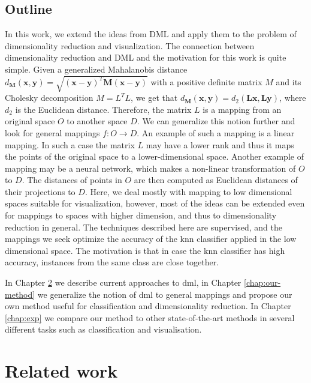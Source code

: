 \documentclass[12pt,a4paper]{report}
\begin{document}
\section{Outline}
In this work, we extend the ideas from DML and apply them to the problem of dimensionality reduction and visualization. The connection between dimensionality reduction and DML and the motivation for this work is quite simple. Given a generalized Mahalanobis distance $d_{\bm{M}}(\textbf{x},\textbf{y}) = \sqrt{(\textbf{x}-\textbf{y})^{T}\bm{M}(\textbf{x}-\textbf{y})}$ with a positive definite matrix $M$ and its Cholesky decomposition $M=L^TL$, we get that $d_{\bm{M}}(\textbf{x},\textbf{y}) = d_{2}(\bm{L}\textbf{x},\bm{L}\textbf{y})$, where $d_2$ is the Euclidean distance. Therefore, the matrix $L$ is a mapping from an original space $O$ to another space $D$. We can generalize this notion further and look for general mappings $f: O \to D$. An example of such a mapping is a linear mapping. In such a case the matrix $L$ may have a lower rank and thus it maps the points of the original space to a lower-dimensional space. Another example of mapping may be a neural network, which makes a non-linear transformation of $O$ to $D$. The distances of points in $O$ are then computed as Euclidean distances of their projections to $D$. Here, we deal mostly with mapping to low dimensional spaces suitable for visualization, however, most of the ideas can be extended even for mappings to spaces with higher dimension, and thus to dimensionality reduction in general. The techniques described here are supervised, and the mappings we seek optimize the accuracy of the \ac{knn} classifier applied in the low dimensional space. The motivation is that in case the \ac{knn} classifier has high accuracy, instances from the same class are close together.

In Chapter \ref{chap:rw} we describe current approaches to \acl{dml}, in Chapter \ref{chap:our-method} we generalize the notion of \ac{dml} to general mappings and propose our own method useful for classification and dimensionality reduction. In Chapter \ref{chap:exp} we compare our method to other state-of-the-art methods in several different tasks such as classification and visualisation.


\chapter{Related work} \label{chap:rw}
\end{document}
